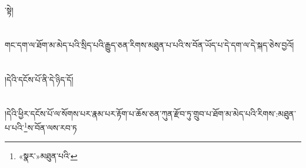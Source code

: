 ་སྟེ།\chapter{ }གང་དག་ལ་ཐོག་མ་མེད་པའི་སྲིད་པའི་རྒྱུད་ཅན་རིགས་མཐུན་པ་པའི་ས་བོན་ཡོད་པ་དེ་དག་ལ་དེ་སྐད་ཅེས་བྱའོ།\chapter{ }།དེའི་དངོས་པོ་ནི་དེ་ཉིད་དོ།\chapter{ }།དེའི་ཕྱིར་དངོས་པོ་ལ་སོགས་པར་རྣམ་པར་རྟོག་པ་ཆོས་ཅན་ཀུན་རྫོབ་ཏུ་གྲུབ་པ་ཐོག་མ་མེད་པའི་རིགས་:མཐུན་པ་པའི་\footnote{«སྣར་»མཐུན་པའི་}ས་བོན་ལས་རབ་ཏ